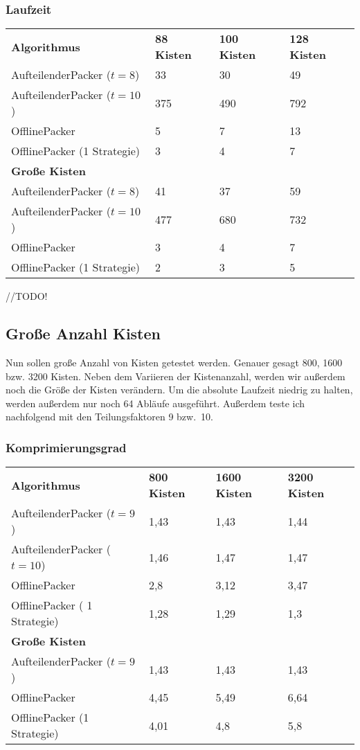 \subsubsection*{Laufzeit}
\begin{tabular}{llll}
\textbf{Algorithmus} 	& \textbf{88 Kisten} 	& \textbf{100 Kisten} 	& \textbf{128 Kisten} 	\\
 AufteilenderPacker ($t=8$)  	& 33		& 30			& 49			\\
 AufteilenderPacker ($t=10$)  	& 375		& 490			& 792			\\
 OfflinePacker			& 5		& 7			& 13			\\
 OfflinePacker (1 Strategie)	& 3		& 4			& 7		\vspace*{.48em} \\
\textbf{Große Kisten} & & & \\
 AufteilenderPacker ($t=8$)  	& 41		& 37			& 59			\\
 AufteilenderPacker ($t=10$)	& 477		& 680			& 732			\\
 OfflinePacker			& 3		& 4			& 7			\\
 OfflinePacker (1 Strategie)	& 2		& 3			& 5			\\
\end{tabular}
  //TODO!

\subsection{Große Anzahl Kisten}
 Nun sollen große Anzahl von Kisten getestet werden. Genauer gesagt 800, 1600 bzw. 3200 Kisten.
 Neben dem Variieren der Kistenanzahl, werden wir außerdem noch die Größe der Kisten verändern.
 Um die absolute Laufzeit niedrig zu halten, werden außerdem nur noch 64 Abläufe ausgeführt.
 Außerdem teste ich nachfolgend mit den Teilungsfaktoren 9 bzw.\ 10.

\subsubsection*{Komprimierungsgrad}
\begin{tabular}{llll}
\textbf{Algorithmus} 	& \textbf{800 Kisten} 	& \textbf{1600 Kisten} 	& \textbf{3200 Kisten} 	\\
 AufteilenderPacker ($t=9$)  	& 1,43		& 1,43			& 1,44			\\
 AufteilenderPacker ($t=10$)  	& 1,46		& 1,47			& 1,47			\\
 OfflinePacker			& 2,8		& 3,12			& 3,47			\\
 OfflinePacker ( 1 Strategie)	& 1,28		& 1,29			& 1,3		\vspace*{.48em} \\
\textbf{Große Kisten} & & & \\
 AufteilenderPacker ($t=9$)  	& 1,43		& 1,43			& 1,43			\\
 OfflinePacker			& 4,45		& 5,49			& 6,64			\\
 OfflinePacker (1 Strategie)	& 4,01		& 4,8			& 5,8			\\
\end{tabular}

